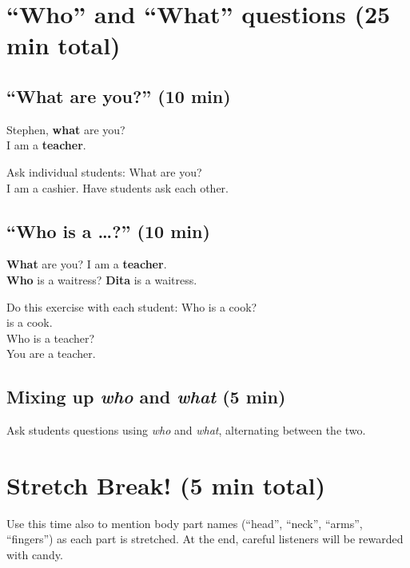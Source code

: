 \section{``Who'' and ``What'' questions (25 min total)}
\subsection{``What are you?'' (10 min)}
\begin{framed}
\dialt Stephen, \textbf{what} are you?\\
\hspace{0em}\hphantom \dialt I am a \textbf{teacher}.
\end{framed}

Ask individual students:
\ex
\dialt What are you?\\
\dials I am a cashier.
\xe
Have students ask each other.

\subsection{``Who is a \ldots?'' (10 min)}
\begin{framed}
\dialt \textbf{What} are you? I am a \textbf{teacher}.\\
\hspace{0em}\hphantom \dialt \textbf{Who} is a waitress? \textbf{Dita} is a waitress.
\end{framed}
Do this exercise with each student:
\ex
\dialt Who is a cook?\\
\dials \underline{\hspace{1.5cm}} is a cook.\\
\dialt Who is a teacher?\\
\dials You are a teacher.
\xe

\subsection{Mixing up \emph{who} and \emph{what} (5 min)}
Ask students questions using \emph{who} and \emph{what}, alternating between the two.

\section{Stretch Break! (5 min total)}
Use this time also to mention body part names (``head'', ``neck'', ``arms'', ``fingers'') as each part is stretched. At the end, careful listeners will be rewarded with candy.

